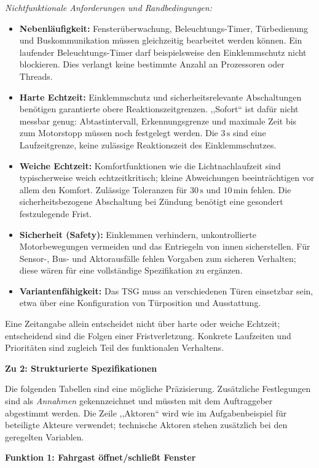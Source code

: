 \begin{loesung}
\emph{Nichtfunktionale Anforderungen und Randbedingungen:}
\begin{itemize}
  \item \textbf{Nebenläufigkeit:} Fensterüberwachung, Beleuchtungs-Timer, Türbedienung und Buskommunikation müssen gleichzeitig bearbeitet werden können. Ein laufender Beleuchtungs-Timer darf beispielsweise den Einklemmschutz nicht blockieren. Dies verlangt keine bestimmte Anzahl an Prozessoren oder Threads.
  \item \textbf{Harte Echtzeit:} Einklemmschutz und sicherheitsrelevante Abschaltungen benötigen garantierte obere Reaktionszeitgrenzen. ,,Sofort`` ist dafür nicht messbar genug: Abtastintervall, Erkennungsgrenze und maximale Zeit bis zum Motorstopp müssen noch festgelegt werden. Die $3\,\mathrm{s}$ sind eine Laufzeitgrenze, keine zulässige Reaktionszeit des Einklemmschutzes.
  \item \textbf{Weiche Echtzeit:} Komfortfunktionen wie die Lichtnachlaufzeit sind typischerweise weich echtzeitkritisch; kleine Abweichungen beeinträchtigen vor allem den Komfort. Zulässige Toleranzen für $30\,\mathrm{s}$ und $10\,\mathrm{min}$ fehlen. Die sicherheitsbezogene Abschaltung bei Zündung benötigt eine gesondert festzulegende Frist.
  \item \textbf{Sicherheit (Safety):} Einklemmen verhindern, unkontrollierte Motorbewegungen vermeiden und das Entriegeln von innen sicherstellen. Für Sensor-, Bus- und Aktorausfälle fehlen Vorgaben zum sicheren Verhalten; diese wären für eine vollständige Spezifikation zu ergänzen.
  \item \textbf{Variantenfähigkeit:} Das TSG muss an verschiedenen Türen einsetzbar sein, etwa über eine Konfiguration von Türposition und Ausstattung.
\end{itemize}
Eine Zeitangabe allein entscheidet nicht über harte oder weiche Echtzeit; entscheidend sind die Folgen einer Fristverletzung. Konkrete Laufzeiten und Prioritäten sind zugleich Teil des funktionalen Verhaltens.

\clearpage
\textbf{Zu 2: Strukturierte Spezifikationen}

Die folgenden Tabellen sind eine mögliche Präzisierung. Zusätzliche Festlegungen sind als \emph{Annahmen} gekennzeichnet und müssten mit dem Auftraggeber abgestimmt werden. Die Zeile ,,Aktoren`` wird wie im Aufgabenbeispiel für beteiligte Akteure verwendet; technische Aktoren stehen zusätzlich bei den geregelten Variablen.

\textbf{Funktion 1: Fahrgast öffnet/schließt Fenster}


\end{loesung}

